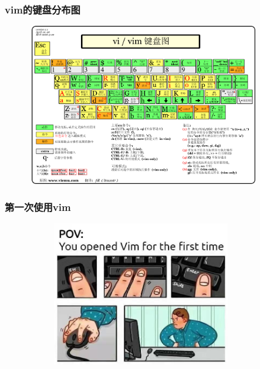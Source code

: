 \frame
{
	\frametitle{\textrm{vim}的键盘分布图}
\vspace*{-18.5pt}
\begin{figure}[h!]
\centering
\hspace*{-5.5pt}
\includegraphics[height=2.8in,width=4.1in,viewport=0 0 1050 750,clip]{Figures/Vim_Key.png}
\label{vim-Key}
\end{figure}
}

\frame
{
	\frametitle{第一次使用\textrm{vim}}
\begin{figure}[h!]
\centering
\vspace{-5.5pt}
\includegraphics[height=2.5in,width=4.0in,viewport=0 0 650 510,clip]{Figures/vim_use_first.jpg}
\label{vim-use-first}
\end{figure}
}

